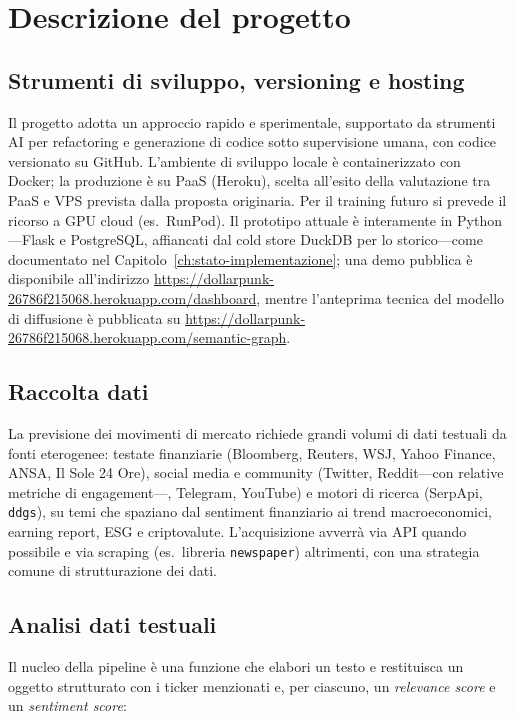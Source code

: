 \chapter{Descrizione del progetto}
\label{ch:descrizione-progetto}

\section{Strumenti di sviluppo, versioning e hosting}

Il progetto adotta un approccio rapido e sperimentale, supportato da strumenti AI per refactoring e generazione di codice sotto supervisione umana, con codice versionato su GitHub.
L'ambiente di sviluppo locale è containerizzato con Docker; la produzione è su PaaS (Heroku), scelta all'esito della valutazione tra PaaS e VPS prevista dalla proposta originaria.
Per il training futuro si prevede il ricorso a GPU cloud (es.\ RunPod).
Il prototipo attuale è interamente in Python---Flask e PostgreSQL, affiancati dal cold store DuckDB per lo storico---come documentato nel Capitolo~\ref{ch:stato-implementazione}; una demo pubblica è disponibile all'indirizzo \url{https://dollarpunk-26786f215068.herokuapp.com/dashboard}, mentre l'anteprima tecnica del modello di diffusione è pubblicata su \url{https://dollarpunk-26786f215068.herokuapp.com/semantic-graph}.

\section{Raccolta dati}

La previsione dei movimenti di mercato richiede grandi volumi di dati testuali da fonti eterogenee: testate finanziarie (Bloomberg, Reuters, WSJ, Yahoo Finance, ANSA, Il Sole 24 Ore), social media e community (Twitter, Reddit---con relative metriche di engagement---, Telegram, YouTube) e motori di ricerca (SerpApi, \texttt{ddgs}), su temi che spaziano dal sentiment finanziario ai trend macroeconomici, earning report, ESG e criptovalute.
L'acquisizione avverrà via API quando possibile e via scraping (es.\ libreria \texttt{newspaper}) altrimenti, con una strategia comune di strutturazione dei dati.

\section{Analisi dati testuali}

Il nucleo della pipeline è una funzione che elabori un testo e restituisca un oggetto strutturato con i ticker menzionati e, per ciascuno, un \emph{relevance score} e un \emph{sentiment score}:

